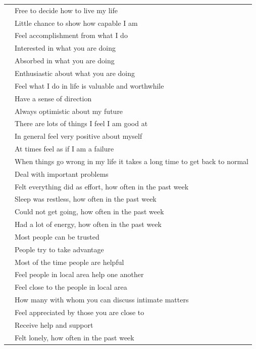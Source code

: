 \documentclass[]{interact}
\theoremstyle{plain}%
\theoremstyle{definition}
\theoremstyle{remark}
\begin{document}
\begin{table}[H]
\begin{tabular}{ll}
\rowcolor{lightgray} & Free to decide how to live my life\\
\rowcolor{lightgray} & Little chance to show how capable I am\\
\rowcolor{lightgray} & Feel accomplishment from what I do\\
\rowcolor{lightgray} & Interested in what you are doing\\
\rowcolor{lightgray} & Absorbed in what you are doing\\
\rowcolor{lightgray} & Enthusiastic about what you are doing\\
\rowcolor{lightgray} & Feel what I do in life is valuable and worthwhile\\
\rowcolor{lightgray} & Have a sense of direction\\
\rowcolor{lightgray} & Always optimistic about my future\\
\rowcolor{lightgray} & There are lots of things I feel I am good at\\
\rowcolor{lightgray} & In general feel very positive about myself\\
\rowcolor{lightgray} & At times feel as if I am a failure\\
\rowcolor{lightgray} & When things go wrong in my life it takes a long time to get back to normal\\
\rowcolor{lightgray}\multirow{-14}{*}{Functioning} & Deal with important problems\\

\rowcolor{white} & Felt everything did as effort, how often in the past week\\
\rowcolor{white} & Sleep was restless, how often in the past week\\
\rowcolor{white} & Could not get going, how often in the past week\\
\rowcolor{white}\multirow{-4}{*}{Vitality} & Had a lot of energy, how often in the past week\\

\rowcolor{lightgray} &  Most people can be trusted\\
\rowcolor{lightgray} &  People try to take advantage\\
\rowcolor{lightgray} &  Most of the time people are helpful\\
\rowcolor{lightgray} &  Feel people in local area help one another\\
\rowcolor{lightgray}\multirow{-5}{*}{Community well-being}& Feel close to the people in local area\\

\rowcolor{white} & How many with whom you can discuss intimate matters\\
\rowcolor{white} & Feel appreciated by those you are close to\\
\rowcolor{white} & Receive help and support\\
\rowcolor{white}\multirow{-4}{*}{Supportive relationships} & Felt lonely, how often in the past week\\
\hline
\end{tabular}
\egroup
\end{table}
\end{document}
